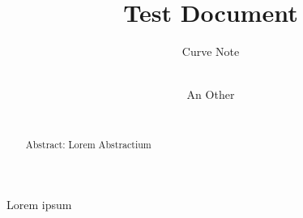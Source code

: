 \documentclass{article}
\title{Test Document}
\date{\displaydate{articleDate}}
\author{Curve Note\\
\\
\and
An Other\\
\\
}
\begin{document}
\maketitle

\begin{abstract}
Abstract: Lorem Abstractium
\end{abstract}


Lorem ipsum



\clearpage

\end{document}
